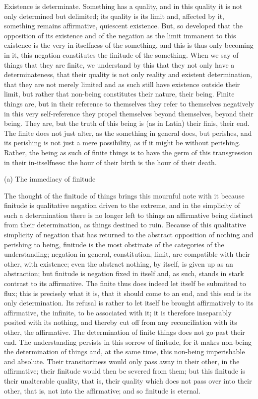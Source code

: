 Existence is determinate.
Something has a quality,
and in this quality it is
not only determined but delimited;
its quality is its limit and, affected by it,
something remains affirmative, quiescent existence.
But, so developed that the opposition of its existence
and of the negation as the limit immanent to this existence is
the very in-itselfness of the something,
and this is thus only becoming in it,
this negation constitutes the finitude of the something.
When we say of things that they are finite,
we understand by this that they not only have a determinateness,
that their quality is not only reality
and existent determination,
that they are not merely limited
and as such still have existence outside their limit,
but rather that non-being constitutes their nature, their being.
Finite things are, but in their reference to themselves
they refer to themselves negatively
in this very self-reference
they propel themselves beyond themselves,
beyond their being.
They are, but the truth of this being is
(as in Latin) their finis, their end.
The finite does not just alter,
as the something in general does,
but perishes, and its perishing is
not just a mere possibility,
as if it might be without perishing.
Rather, the being as such of finite things is
to have the germ of this transgression
in their in-itselfness:
the hour of their birth is the hour of their death.

(a) The immediacy of finitude

The thought of the finitude of things
brings this mournful note with it
because finitude is qualitative negation driven to the extreme,
and in the simplicity of such a determination
there is no longer left to things
an affirmative being distinct from their determination,
as things destined to ruin.
Because of this qualitative simplicity of negation
that has returned to the abstract opposition of
nothing and perishing to being,
finitude is the most obstinate of
the categories of the understanding;
negation in general, constitution, limit,
are compatible with their other, with existence;
even the abstract nothing, by itself,
is given up as an abstraction;
but finitude is negation fixed in itself
and, as such, stands in stark contrast to its affirmative.
The finite thus does indeed let itself be submitted to flux;
this is precisely what it is,
that it should come to an end,
and this end is its only determination.
Its refusal is rather to let itself be brought
affirmatively to its affirmative, the infinite,
to be associated with it;
it is therefore inseparably posited with its nothing,
and thereby cut off from any reconciliation
with its other, the affirmative.
The determination of finite things does not go past their end.
The understanding persists in this sorrow of finitude,
for it makes non-being the determination of things
and, at the same time, this non-being imperishable and absolute.
Their transitoriness would only pass away in their other,
in the affirmative;
their finitude would then be severed from them;
but this finitude is their unalterable quality, that is,
their quality which does not pass over into their other, that is,
not into the affirmative;
and so finitude is eternal.

